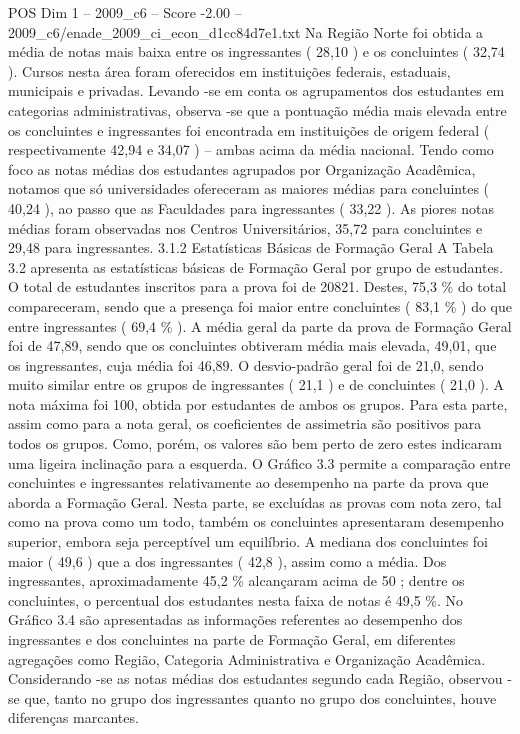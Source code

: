 \begin{textsample}{POS Dim 1 – 2009\_c6 – Score -2.00 – 2009\_c6/enade\_2009\_ci\_econ\_d1cc84d7e1.txt}
Na Região Norte foi obtida a média de notas mais baixa entre os ingressantes ( 28,10 ) e os concluintes ( 32,74 ).
Cursos nesta área foram oferecidos em instituições federais, estaduais, municipais e privadas.
Levando -se em conta os agrupamentos dos estudantes em categorias administrativas, observa -se que a pontuação média mais elevada entre os concluintes e ingressantes foi encontrada em instituições de origem federal ( respectivamente 42,94 e 34,07 ) – ambas acima da média nacional.
Tendo como foco as notas médias dos estudantes agrupados por Organização Acadêmica, notamos que só universidades ofereceram as maiores médias para concluintes ( 40,24 ), ao passo que as Faculdades para ingressantes ( 33,22 ).
As piores notas médias foram observadas nos Centros Universitários, 35,72 para concluintes e 29,48 para ingressantes. 3.1.2 Estatísticas Básicas de Formação Geral A Tabela 3.2 apresenta as estatísticas básicas de Formação Geral por grupo de estudantes.
O total de estudantes inscritos para a prova foi de 20821.
Destes, 75,3 \% do total compareceram, sendo que a presença foi maior entre concluintes ( 83,1 \% ) do que entre ingressantes ( 69,4 \% ).
A média geral da parte da prova de Formação Geral foi de 47,89, sendo que os concluintes obtiveram média mais elevada, 49,01, que os ingressantes, cuja média foi 46,89.
O desvio-padrão geral foi de 21,0, sendo muito similar entre os grupos de ingressantes ( 21,1 ) e de concluintes ( 21,0 ).
A nota máxima foi 100, obtida por estudantes de ambos os grupos.
Para esta parte, assim como para a nota geral, os coeficientes de assimetria são positivos para todos os grupos.
Como, porém, os valores são bem perto de zero estes indicaram uma ligeira inclinação para a esquerda.
O Gráfico 3.3 permite a comparação entre concluintes e ingressantes relativamente ao desempenho na parte da prova que aborda a Formação Geral.
Nesta parte, se excluídas as provas com nota zero, tal como na prova como um todo, também os concluintes apresentaram desempenho superior, embora seja perceptível um equilíbrio.
A mediana dos concluintes foi maior ( 49,6 ) que a dos ingressantes ( 42,8 ), assim como a média.
Dos ingressantes, aproximadamente 45,2 \% alcançaram acima de 50 ; dentre os concluintes, o percentual dos estudantes nesta faixa de notas é 49,5 \%.
No Gráfico 3.4 são apresentadas as informações referentes ao desempenho dos ingressantes e dos concluintes na parte de Formação Geral, em diferentes agregações como Região, Categoria Administrativa e Organização Acadêmica.
Considerando -se as notas médias dos estudantes segundo cada Região, observou -se que, tanto no grupo dos ingressantes quanto no grupo dos concluintes, houve diferenças marcantes.

\end{textsample}
